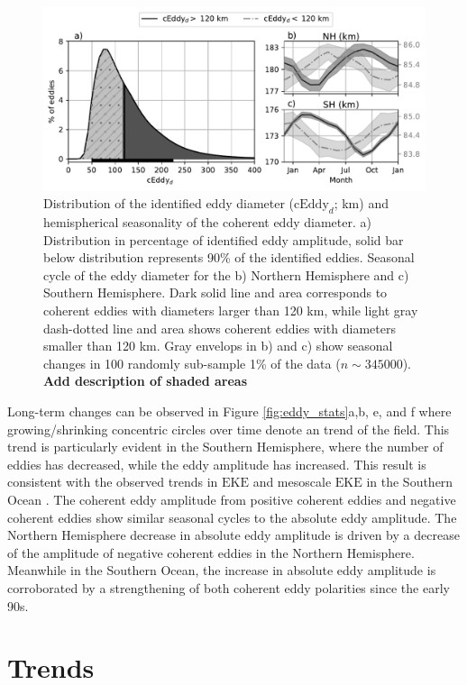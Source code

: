 \documentclass[draft,linenumbers]{agujournal2019}
\newcommand{\EKE}{\textrm{EKE}}
\newcommand{\cEddy}{\textrm{cEddy}}
\begin{document}
	\begin{figure}
	    \centering
	    \includegraphics[width=1\textwidth]{./figures/eddy_diameter_seasonal.pdf}
	    \caption{Distribution of the identified eddy diameter ($\cEddy_d$; km) and hemispherical seasonality of the coherent eddy diameter. a) Distribution in percentage of identified eddy amplitude, solid bar below distribution represents 90\% of the identified eddies. Seasonal cycle of the eddy diameter for the b) Northern Hemisphere and c) Southern Hemisphere. Dark solid line and area corresponds to coherent eddies with diameters larger than 120 km, while light gray dash-dotted line and area shows coherent eddies with diameters smaller than 120 km. Gray envelops in b) and c) show seasonal changes in 100 randomly sub-sample 1\% of the data ($n\sim345000$). \textbf{Add description of shaded areas}}
	    \label{fig:eddy_diameter}
	\end{figure}

	Long-term changes can be observed in Figure \ref{fig:eddy_stats}a,b, e, and f where growing/shrinking concentric circles over time denote an trend of the field. 
	This trend is particularly evident in the Southern Hemisphere, where the number of eddies has decreased, while the eddy amplitude has increased. 
	This result is consistent with the observed trends in $\EKE$ and mesoscale $\EKE$ in the Southern Ocean \citep{Hogg_Recent_2015, Martinez_TKE_2019}. The coherent eddy amplitude from positive coherent eddies and negative coherent eddies show similar seasonal cycles to the absolute eddy amplitude. The Northern Hemisphere decrease in absolute eddy amplitude is driven by a decrease of the amplitude of negative coherent eddies in the Northern Hemisphere. Meanwhile in the Southern Ocean, the increase in absolute eddy amplitude is corroborated by a strengthening of both coherent eddy polarities since the early 90s.

	\section{Trends}
	\label{sec:CE_trends}	
	
\end{document}
